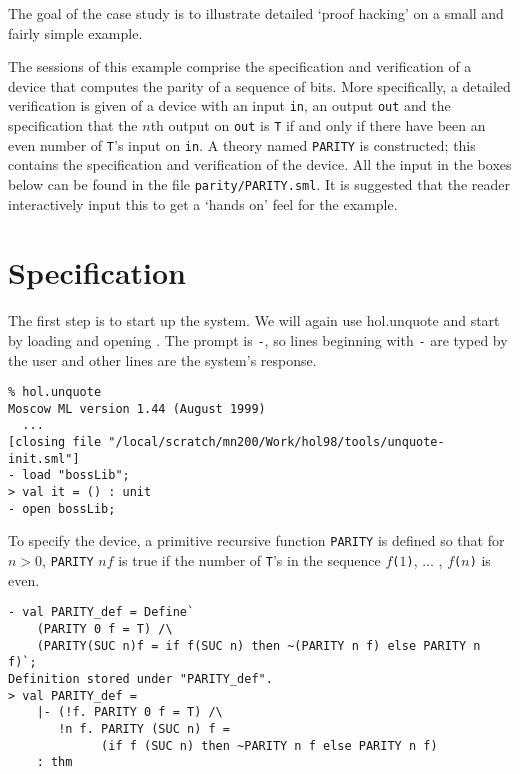 The goal of the case study is to illustrate detailed `proof hacking'
on a small and fairly simple example.

The sessions of this example comprise the specification and
verification of a device that computes the parity of a sequence of
bits.  More specifically, a detailed verification is given of a device
with an input {\small\verb|in|}, an output {\small\verb|out|} and the
specification that the $n$th output on {\small\verb|out|} is
{\small\verb|T|} if and only if there have been an even number of
{\small\verb|T|}'s input on {\small\verb|in|}. A theory named
{\small\verb|PARITY|} is constructed; this contains the specification
and verification of the device. All the \ML{} input in the boxes below
can be found in the file {\small\verb|parity/PARITY.sml|}. It is
suggested that the reader interactively input this to get a `hands on'
feel for the example.


\section{Specification}
\label{example}
The first step is to start up the \HOL{} system.  We will again use
\textsf{hol.unquote} and start by loading and opening .
The \ML{} prompt is {\small\verb|-|}, so lines beginning with
{\small\verb|-|} are typed by the user and other lines are the
system's response.

\setcounter{sessioncount}{1}
\begin{session}
\begin{verbatim}
% hol.unquote
Moscow ML version 1.44 (August 1999)
  ...
[closing file "/local/scratch/mn200/Work/hol98/tools/unquote-init.sml"]
- load "bossLib";
> val it = () : unit
- open bossLib;
\end{verbatim}
\end{session}

\noindent To specify the device, a primitive recursive
function {\small\verb|PARITY|} is defined so that for $n>0$,
{\small\tt PARITY} $n f$ is true if the number of {\small\verb|T|}'s
in the sequence $f${\small\tt (}$1${\small\tt)}, $\ldots$ ,
$f${\small\tt (}$n${\small\tt)} is even.

\begin{session}
\begin{verbatim}
- val PARITY_def = Define`
    (PARITY 0 f = T) /\
    (PARITY(SUC n)f = if f(SUC n) then ~(PARITY n f) else PARITY n f)`;
Definition stored under "PARITY_def".
> val PARITY_def =
    |- (!f. PARITY 0 f = T) /\
       !n f. PARITY (SUC n) f =
             (if f (SUC n) then ~PARITY n f else PARITY n f)
    : thm
\end{verbatim}
\end{session}


